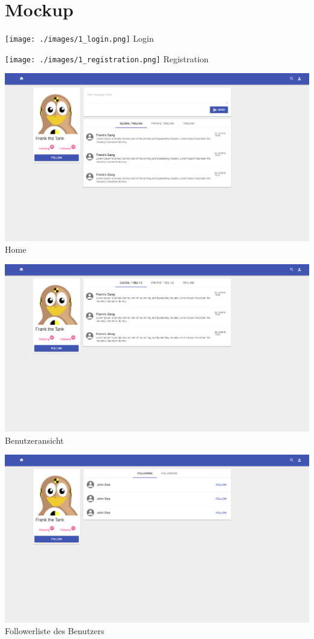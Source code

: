 \documentclass[
    a4paper
]{scrreprt}
\begin{document}
    \section{Mockup}
		\texttt{[image: ./images/1\_login.png]}
		Login\par\vspace{.6cm}
		\texttt{[image: ./images/1\_registration.png]}
		Registration\par\vspace{.6cm}
		\includegraphics[width=\textwidth]{./images/1_home.png}
		Home\par\vspace{.6cm}
		\includegraphics[width=\textwidth]{./images/1_user.png}
		Benutzeransicht\par\vspace{.6cm}
		\includegraphics[width=\textwidth]{./images/1_user_followers.png}
		Followerliste des Benutzers
\end{document}

